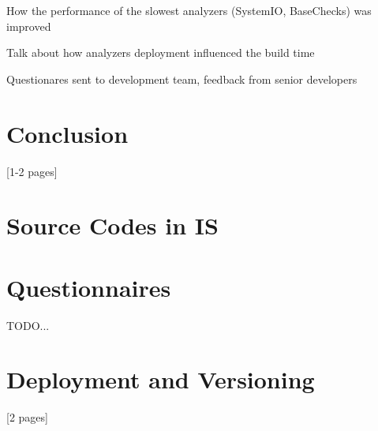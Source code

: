 \documentclass[
  digital, %
  table,   %
  lof,     %
  lot,     %
  oneside,
]{fithesis3}
\begin{document}
How the performance of the slowest analyzers (SystemIO, BaseChecks) was improved

Talk about how analyzers deployment influenced the build time

Questionares sent to development team, feedback from senior developers

\chapter{Conclusion}
[1-2 pages]

	\makeatletter\thesis@blocks@clear\makeatother

	\printindex
    
  \printbibliography

	\appendix %
  \chapter{Source Codes in IS}
  \chapter{Questionnaires}
TODO...

  \chapter{Deployment and Versioning}
[2 pages]
\end{document}
